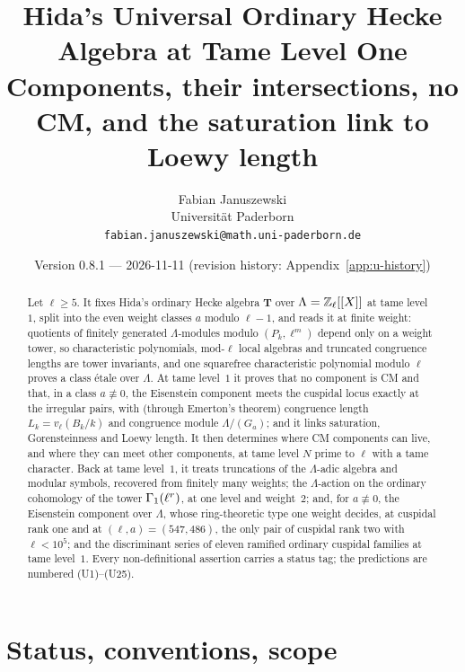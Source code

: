 \documentclass[11pt]{article}
\title{Hida's Universal Ordinary Hecke Algebra at Tame Level One\\[1ex]
\large Components, their intersections, no CM, and the saturation link to Loewy length}
\author{Fabian Januszewski\\ Universit\"at Paderborn\\ \texttt{fabian.januszewski@math.uni-paderborn.de}}
\date{Version 0.8.1 --- 2026-11-11 (revision history: Appendix~\ref{app:u-history})}
\newcommand{\Iw}{\Lambda}                         %
\newcommand{\Tu}{\mathbf{T}}                      %
\newcommand{\Zl}{\Z_\ell}
\begin{document}
\maketitle

\begin{abstract}
Let $\ell\ge5$. It fixes Hida's ordinary Hecke algebra $\Tu$ over $\Iw=\Zl[[X]]$ at tame level~$1$, split into the
even weight classes $a$ modulo $\ell-1$, and reads it at finite weight: quotients of finitely generated $\Iw$-modules modulo
$(P_k,\ell^m)$ depend only on a weight tower, so characteristic polynomials, mod-$\ell$ local algebras and truncated congruence
lengths are tower invariants, and one squarefree characteristic polynomial modulo $\ell$ proves a class étale over $\Iw$. At tame
level~$1$ it proves that no component is CM and that, in a class $a\not\equiv0$, the Eisenstein component meets the cuspidal locus
exactly at the irregular pairs, with (through Emerton's theorem) congruence length $L_k=v_\ell(B_k/k)$ and congruence module
$\Iw/(G_a)$; and it links saturation, Gorensteinness and Loewy length. It then determines where CM components can live, and where
they can meet other components, at tame level $N$ prime to $\ell$ with a tame character. Back at tame level~$1$, it treats truncations
of the $\Iw$-adic algebra and modular symbols, recovered from finitely many weights; the $\Iw$-action on the ordinary cohomology of
the tower $\Gamma_1(\ell^{r})$, at one level and weight~$2$; and, for $a\not\equiv0$, the Eisenstein component over $\Iw$, whose
ring-theoretic type one weight decides, at cuspidal rank one and at $(\ell,a)=(547,486)$, the only pair of cuspidal rank two with
$\ell<10^{5}$; and the discriminant series of eleven ramified ordinary cuspidal families at tame level~$1$. Every non-definitional assertion carries a status tag; the predictions are numbered (U1)--(U25).
\end{abstract}

\tableofcontents

\section{Status, conventions, scope}\label{sec:u-status}
\end{document}
